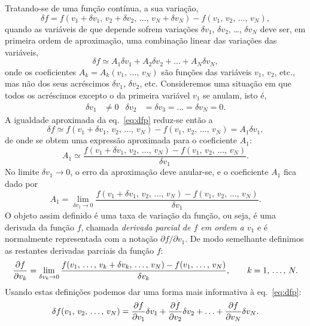 Tratando-se de uma função contínua, a sua variação, 
\begin{equation*}
\delta f=f(v_1+\delta v_1,\,v_2+\delta v_2,\,\ldots,\,v_N+\delta v_N)-
f(v_1,\,v_2,\,\ldots,\,v_N),
\end{equation*}
quando as variáveis de que depende sofrem variações $\delta v_1$, $\delta v_2$,
\ldots, $\delta v_N$ deve ser, em primeira ordem de aproximação, uma combinação
linear das variações das variáveis,
\begin{equation}\label{eq:dfp}
\delta f\simeq A_1\delta v_1+A_2\delta v_2+\ldots+A_N\delta v_N,
\end{equation}
onde os coeficientes $A_k=A_k(v_1,\,\ldots,\,v_N)$ são funções das variáveis
$v_1$, $v_2$, etc., mas não dos seus acréscimos $\delta v_1$, $\delta v_2$, etc.
Consideremos uma situação em que todos os acréscimos excepto o da primeira
variável $v_1$ se anulam, isto é,
\begin{align*}
\delta v_1&\neq0&\delta v_2&=\delta v_3=\ldots=\delta v_N=0.
\end{align*}
A igualdade aproximada da eq.~\eqref{eq:dfp} reduz-se então a 
\begin{equation*}
\delta f\simeq f(v_1+\delta v_1,\,v_2,\,\ldots,\,v_N)-
    f(v_1,\,v_2,\,\ldots,\,v_N)= A_1\delta v_1,
\end{equation*}
de onde se obtem uma expressão aproximada para o coeficiente $A_1$:
\begin{equation*}
A_1\simeq
    \frac{f(v_1+\delta v_1,\,v_2,\,\ldots,\,v_N)
              -f(v_1,\,v_2,\,\ldots,\,v_N)}{\delta v_1}.
\end{equation*}
No limite $\delta v_1\rightarrow0$, o erro da aproximação deve anular-se, e o
coeficiente $A_1$ fica dado por
\begin{equation*}
A_1=\lim_{\delta v_1\rightarrow0}
    \frac{f(v_1+\delta v_1,\,v_2,\,\ldots,\,v_N)
              -f(v_1,\,v_2,\,\ldots,\,v_N)}{\delta v_1}.
\end{equation*}
O objeto assim definido é uma taxa de variação da função, ou seja, é uma
derivada da função $f$, chamada \emph{derivada parcial de $f$ em ordem a $v_1$}
e é normalmente representada com a notação $\partial f/\partial v_1$. De modo
semelhante definimos as restantes derivadas parciais da função $f$:
\begin{equation}
    \frac{\partial f}{\partial v_k} = \lim_{\delta v_k\rightarrow0}
    \frac{f(v_1,\,\ldots,\,v_k+\delta v_k,\,\ldots,\,v_N)-
        f(v_1,\,\ldots,\,v_N)}{\delta v_k},\qquad k=1,\,\ldots,\,N.
\end{equation}
Usando estas definições podemos dar uma forma mais informativa à
eq.~\eqref{eq:dfp}:
\begin{equation}\label{eq:df}
\delta f(v_1,\,v_2,\,\ldots,\,v_N)=\frac{\partial f}{\partial v_1}\delta v_1+\frac{\partial f}{\partial v_2}\delta v_2
    +\ldots+ \frac{\partial f}{\partial v_N}\delta v_N.
\end{equation}

